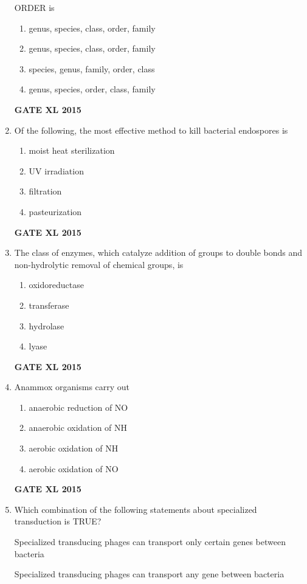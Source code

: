 \documentclass[journal,12pt,onecolumn]{IEEEtran}
\begin{document}
\begin{enumerate}
ORDER is
    \begin{enumerate}
            \item genus, species, class, order, family
	    \item genus, species, class, order, family
	    \item species, genus, family, order, class
            \item genus, species, order, class, family
    \end{enumerate}
\hfill{\textbf{GATE XL 2015}}
\item Of the following, the most effective method to kill bacterial endospores is 
    \begin{enumerate}
            \item moist heat sterilization
	    \item UV irradiation
	    \item filtration
            \item pasteurization
    \end{enumerate}
\hfill{\textbf{GATE XL 2015}}
\item The class of enzymes, which catalyze addition of groups to double bonds and non-hydrolytic removal of chemical groups, is
    \begin{enumerate}
            \item oxidoreductase
	    \item transferase
	    \item hydrolase
            \item lyase
    \end{enumerate}
\hfill{\textbf{GATE XL 2015}}
\item Anammox organisms carry out
    \begin{enumerate}
            \item anaerobic reduction of NO
	    \item anaerobic oxidation of NH 
	    \item aerobic oxidation of NH
            \item aerobic oxidation of NO
    \end{enumerate}
\hfill{\textbf{GATE XL 2015}}
\item Which combination of the following statements about specialized transduction is TRUE?

 Specialized transducing phages can transport only certain genes between bacteria

 Specialized transducing phages can transport any gene between bacteria


\end{enumerate}
\end{document}
